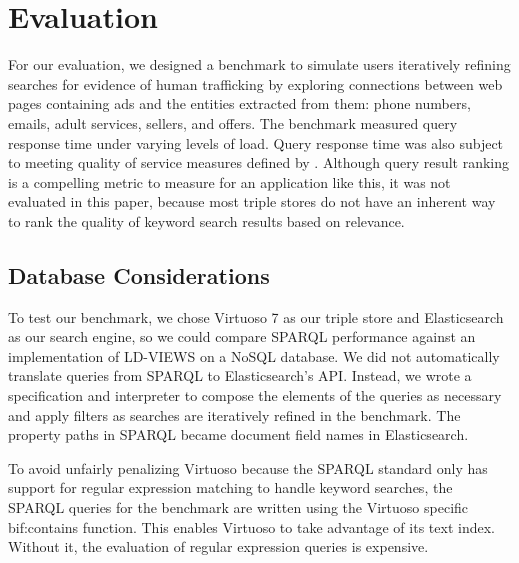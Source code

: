 \section{Evaluation}
\label{sec:evaluation}



For our evaluation, we designed a benchmark to simulate users iteratively refining searches for evidence of human trafficking by exploring connections between web pages containing ads and the entities extracted from them: phone numbers, emails, adult services, sellers, and offers.
The benchmark measured query response time under varying levels of load.
Query response time was also subject to meeting quality of service measures defined by \cite{nielsen1994usability}.
Although query result ranking is a compelling metric to measure for an application like this, it was not evaluated in this paper, because most triple stores do not have an inherent way to rank the quality of keyword search results based on relevance.

\subsection{Database Considerations}
To test our benchmark, we chose Virtuoso 7 as our triple store and Elasticsearch as our search engine, so we could compare SPARQL performance against an implementation of LD-VIEWS on a NoSQL database.  
We did not automatically translate queries from SPARQL to Elasticsearch's API.  
Instead, we wrote a specification and interpreter to compose the elements of the queries as necessary and apply filters as searches are iteratively refined in the benchmark.  
The property paths in SPARQL became document field names in Elasticsearch.  

To avoid unfairly penalizing Virtuoso because the SPARQL standard only has support for regular expression matching to handle keyword searches, the SPARQL queries for the benchmark are written using the Virtuoso specific bif:contains function.
This enables Virtuoso to take advantage of its text index.  
Without it, the evaluation of regular expression queries is expensive.  


